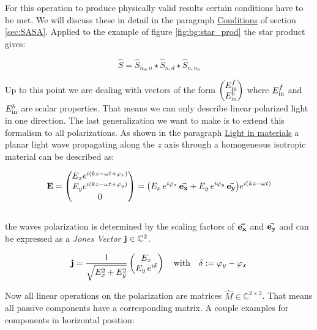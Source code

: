 For this operation to produce physically valid results certain conditions have to be met. We will discuss these in detail in the paragraph \hyperref[par:conditions]{Conditions} of section \ref{sec:SASA}.
Applied to the example of figure \ref{fig:bg:star_prod} the star product gives:

\begin{equation}
    \hat S = \hat S_{n_0, n} \star \hat S_{n, d} \star \hat S_{n, n_0}
\end{equation}

Up to this point we are dealing with vectors of the form
$
\begin{pmatrix}
    E^f_{\mathrm{in}} \\
    E^b_{\mathrm{in}}
\end{pmatrix}
$
where $E^f_{\mathrm{in}}$ and $E^b_{\mathrm{in}}$ are scalar properties. That means we can only describe linear polarized light in one direction. The last generalization we want to make is to extend this formalism to all polarizations. As shown in the paragraph \hyperref[par:light_in_materials]{Light in materials} a planar light wave propagating along the $z$ axis through a homogeneous isotropic material can be described as:

\begin{equation}
   \vb E =
   \begin{pmatrix}
       E_x e^{i(kz - \omega t + \varphi_x)}\\
       E_y e^{i(kz - \omega t + \varphi_y)}\\
       0\\
   \end{pmatrix}
   =
   \qty(E_x \, e^{i \varphi_x} \, \va{e_x} +
        E_y \, e^{i \varphi_y} \, \va{e_y})
       e^{i(kz - \omega t)}
\end{equation}
\\

\noindent
the waves polarization is determined by the scaling factors of $\va{e_x}$ and $\va{e_y}$ and can be expressed as a \textit{Jones Vector} $\vb j \in \mathbb{C}^2$.

\begin{equation}
   \vb j = \frac{1}{\sqrt{E_x^2 + E_y^2}}
   \begin{pmatrix}
       E_x\\
       E_y \, e^{i \delta}
   \end{pmatrix}
   \qq{with}
   \delta := \varphi_y - \varphi_x
\end{equation}

\noindent
Now all linear operations on the polarization are matrices $\hat{M} \in \mathbb{C}^{2 \times 2}$. That means all passive components have a corresponding matrix. A couple examples for components in horizontal position:


